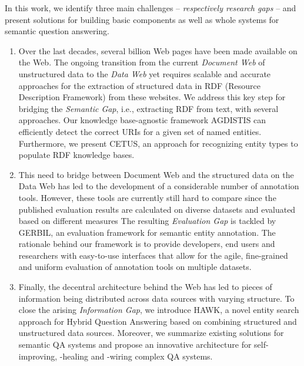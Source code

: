 In this work, we identify three main challenges -- \emph{respectively research gaps} -- and present solutions for building basic components as well as whole systems for semantic question answering.
\begin{enumerate}
\item 
Over the last decades, several billion Web pages have been made available on the Web. 
The ongoing transition from the current \emph{Document Web} of unstructured data to the \emph{Data Web} yet requires scalable and accurate approaches for the extraction of structured data in RDF (Resource Description Framework) from these websites.
We address this key step for bridging the \emph{Semantic Gap}, i.e., extracting RDF from text,  with several approaches.
Our knowledge base-agnostic framework AGDISTIS can efficiently detect the correct URIs for a given set of named entities.
Furthermore, we present CETUS, an approach for recognizing entity types to populate RDF knowledge bases. 
\item 
This need to bridge between Document Web and the structured data on the Data Web has led to the development of a considerable number of annotation tools. However, these tools are currently still hard to compare since the published evaluation results are calculated on diverse datasets and evaluated based on different measures
The resulting \emph{Evaluation Gap} is tackled by GERBIL, an evaluation framework for semantic entity annotation. The rationale behind our framework is to provide developers, end users and researchers with easy-to-use interfaces that allow for the agile, fine-grained and uniform evaluation of annotation tools on multiple datasets.
\item 
Finally, the decentral architecture behind the Web has led to pieces of information being distributed across data sources with varying structure. 
To close the arising \emph{Information Gap}, we introduce HAWK, a novel entity search approach for Hybrid Question Answering based on combining structured and unstructured data sources.
Moreover, we summarize existing solutions for semantic QA systems and propose an innovative architecture for self-improving, -healing and -wiring complex QA systems.
\end{enumerate}
%
